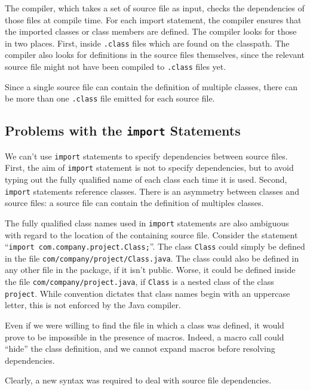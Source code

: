 The compiler, which takes a set of source file as input, checks the dependencies
of those files at compile time. For each import statement, the compiler ensures
that the imported classes or class members are defined. The compiler looks for
those in two places. First, inside \texttt{.class} files which are found on the
classpath. The compiler also looks for definitions in the source files
themselves, since the relevant source file might not have been compiled to
\texttt{.class} files yet.

Since a single source file can contain the definition of multiple classes, there
can be more than one \texttt{.class} file emitted for each source file.

\subsection{Problems with the \texttt{import} Statements}
\label{import_problems}

We can't use \texttt{import} statements to specify dependencies between source
files. First, the aim of \texttt{import} statement is not to specify
dependencies, but to avoid typing out the fully qualified name of each class
each time it is used. Second, \texttt{import} statements reference
classes. There is an asymmetry between classes and source files: a source file
can contain the definition of multiples classes.

The fully qualified class names used in \texttt{import} statements are also
ambiguous with regard to the location of the containing source file. Consider
the statement ``\texttt{import com.company.project.Class;}''. The class
\texttt{Class} could simply be defined in the file
\texttt{com/company/project/Class.java}. The class could also be defined in any
other file in the package, if it isn't public. Worse, it could be defined inside
the file \texttt{com/company/project.java}, if \texttt{Class} is a nested class
of the class \texttt{project}. While convention dictates that class names begin
with an uppercase letter, this is not enforced by the Java compiler.

Even if we were willing to find the file in which a class was defined, it would
prove to be impossible in the presence of macros. Indeed, a macro call could
``hide'' the class definition, and we cannot expand macros before resolving
dependencies.

Clearly, a new syntax was required to deal with source file dependencies.

